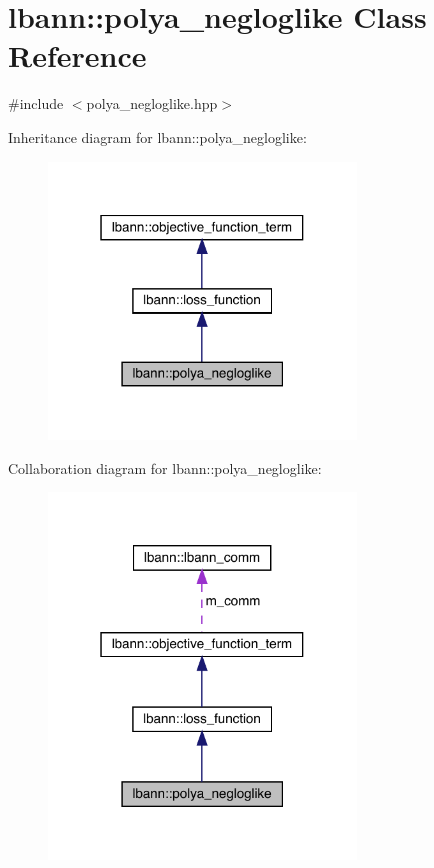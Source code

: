 \hypertarget{classlbann_1_1polya__negloglike}{}\section{lbann\+:\+:polya\+\_\+negloglike Class Reference}
\label{classlbann_1_1polya__negloglike}


{\ttfamily \#include $<$polya\+\_\+negloglike.\+hpp$>$}



Inheritance diagram for lbann\+:\+:polya\+\_\+negloglike\+:\nopagebreak
\begin{figure}[H]
\begin{center}
\leavevmode
\includegraphics[width=232pt]{classlbann_1_1polya__negloglike__inherit__graph}
\end{center}
\end{figure}


Collaboration diagram for lbann\+:\+:polya\+\_\+negloglike\+:\nopagebreak
\begin{figure}[H]
\begin{center}
\leavevmode
\includegraphics[width=232pt]{classlbann_1_1polya__negloglike__coll__graph}
\end{center}
\end{figure}
